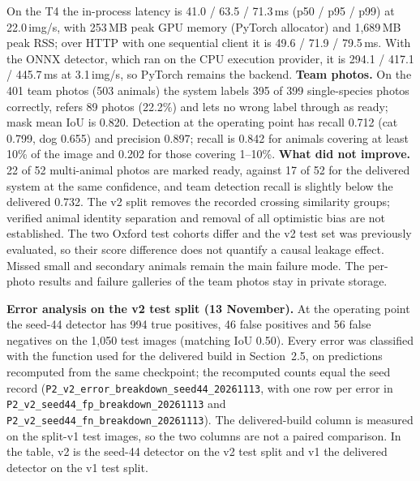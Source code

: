 \documentclass[11pt,a4paper]{article}
\newcommand{\ev}[1]{\nolinkurl{#1}}
\begin{document}
On the T4 the in-process latency is 41.0 / 63.5 / 71.3\,ms (p50 / p95 / p99) at 22.0\,img/s, with 253\,MB peak GPU memory (PyTorch allocator) and 1,689\,MB peak RSS; over HTTP with one sequential client it is 49.6 / 71.9 / 79.5\,ms. With the ONNX detector, which ran on the CPU execution provider, it is 294.1 / 417.1 / 445.7\,ms at 3.1\,img/s, so PyTorch remains the backend. \textbf{Team photos.} On the 401 team photos (503 animals) the system labels 395 of 399 single-species photos correctly, refers 89 photos (22.2\%) and lets no wrong label through as ready; mask mean IoU is 0.820. Detection at the operating point has recall 0.712 (cat 0.799, dog 0.655) and precision 0.897; recall is 0.842 for animals covering at least 10\% of the image and 0.202 for those covering 1--10\%. \textbf{What did not improve.} 22 of 52 multi-animal photos are marked ready, against 17 of 52 for the delivered system at the same confidence, and team detection recall is slightly below the delivered 0.732. The v2 split removes the recorded crossing similarity groups; verified animal identity separation and removal of all optimistic bias are not established. The two Oxford test cohorts differ and the v2 test set was previously evaluated, so their score difference does not quantify a causal leakage effect. Missed small and secondary animals remain the main failure mode. The per-photo results and failure galleries of the team photos stay in private storage.

\textbf{Error analysis on the v2 test split (13 November).} At the operating point the seed-44 detector has 994 true positives, 46 false positives and 56 false negatives on the 1,050 test images (matching IoU 0.50). Every error was classified with the function used for the delivered build in Section~2.5, on predictions recomputed from the same checkpoint; the recomputed counts equal the seed record (\ev{P2_v2_error_breakdown_seed44_20261113}, with one row per error in \ev{P2_v2_seed44_fp_breakdown_20261113} and \ev{P2_v2_seed44_fn_breakdown_20261113}). The delivered-build column is measured on the split-v1 test images, so the two columns are not a paired comparison. In the table, v2 is the seed-44 detector on the v2 test split and v1 the delivered detector on the v1 test split.
\end{document}
